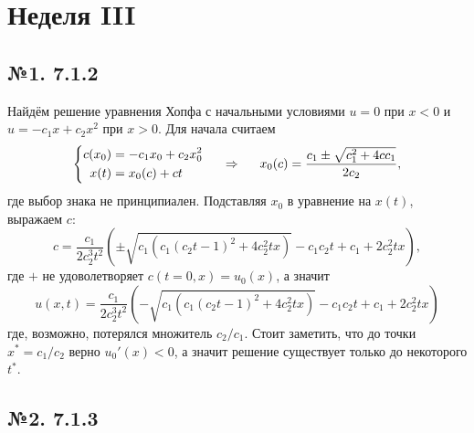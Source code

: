 \section{Неделя III}


\subsection*{№1. 7.1.2}

Найдём решение уравнения Хопфа с начальными условиями $u = 0$ при $x < 0$ и $u = -c_1 x + c_2 x^2$ при $x > 0$. Для начала считаем
\begin{equation*}
    \left\{\begin{aligned}
        c(x_0) &= - c_1 x_0 + c_2 x_0^2  \\
        x(t) &= x_0 (c) + c t
    \end{aligned}\right.
    \hspace{0.5cm} \Rightarrow \hspace{0.5cm}
    x_0 (c) = \frac{c_1 \pm \sqrt{c_1^2 + 4 c c_1}}{2 c_2},
\end{equation*}
где выбор знака не принципиален. Подставляя $x_0$ в уравнение на $x(t)$, выражаем $c$:
\begin{equation*}
    c = \frac{c_1}{2 c_2^3 t^2} \left(
        \pm \sqrt{c_1 \left(c_1 (c_2 t-1)^2+4 c_2^2 t x\right)}-c_1 c_2 t+c_1+2 c_2^2 t x
    \right),
\end{equation*}
где $+$ не удоволетворяет $c(t=0, x) = u_0 (x)$, а значит
\begin{equation*}
    u(x, t) = \frac{c_1}{2 c_2^3 t^2} \left(
        - \sqrt{c_1 \left(c_1 (c_2 t-1)^2+4 c_2^2 t x\right)}-c_1 c_2 t+c_1+2 c_2^2 t x
    \right)
\end{equation*}
где, возможно, потерялся множитель $c_2/c_1$. 
Стоит заметить, что до точки $x^* = c_1/c_2$ верно $u_0'(x) < 0$, а значит решение существует только до некоторого $t^*$. 


\subsection*{№2. 7.1.3}

